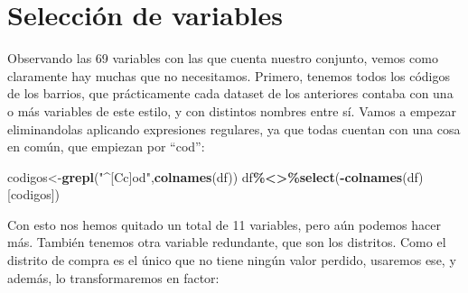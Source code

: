 \documentclass[notspecified,article,submit,moreauthors,pdftex]{Definitions/mdpi}
\newenvironment{Shaded}{\begin{snugshade}}{\end{snugshade}}
\newcommand{\AttributeTok}[1]{\textcolor[rgb]{0.13,0.29,0.53}{#1}}
\newcommand{\FunctionTok}[1]{\textcolor[rgb]{0.13,0.29,0.53}{\textbf{#1}}}
\newcommand{\NormalTok}[1]{#1}
\newcommand{\OtherTok}[1]{\textcolor[rgb]{0.56,0.35,0.01}{#1}}
\newcommand{\SpecialCharTok}[1]{\textcolor[rgb]{0.81,0.36,0.00}{\textbf{#1}}}
\newcommand{\StringTok}[1]{\textcolor[rgb]{0.31,0.60,0.02}{#1}}
\begin{document}
\hypertarget{selecciuxf3n-de-variables}{%
\section{Selección de variables}\label{selecciuxf3n-de-variables}}

Observando las 69 variables con las que cuenta nuestro conjunto, vemos
como claramente hay muchas que no necesitamos. Primero, tenemos todos
los códigos de los barrios, que prácticamente cada dataset de los
anteriores contaba con una o más variables de este estilo, y con
distintos nombres entre sí. Vamos a empezar eliminandolas aplicando
expresiones regulares, ya que todas cuentan con una cosa en común, que
empiezan por ``cod'':

\begin{Shaded}
\begin{Highlighting}[]
\NormalTok{codigos}\OtherTok{\textless{}{-}}\FunctionTok{grepl}\NormalTok{(}\StringTok{"\^{}[Cc]od"}\NormalTok{,}\FunctionTok{colnames}\NormalTok{(df))}
\NormalTok{df}\SpecialCharTok{\%\textless{}\textgreater{}\%}\FunctionTok{select}\NormalTok{(}\SpecialCharTok{{-}}\FunctionTok{colnames}\NormalTok{(df)[codigos])}
\end{Highlighting}
\end{Shaded}

Con esto nos hemos quitado un total de 11 variables, pero aún podemos
hacer más. También tenemos otra variable redundante, que son los
distritos. Como el distrito de compra es el único que no tiene ningún
valor perdido, usaremos ese, y además, lo transformaremos en factor:

\begin{Shaded}
\end{Shaded}
\end{document}
